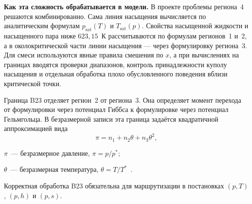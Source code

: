 \textbf{Как эта сложность обрабатывается в модели.}
В проекте проблемы региона~4 решаются комбинированно.
Сама линия насыщения вычисляется по аналитическим формулам
$p_{\mathrm{sat}}(T)$ и $T_{\mathrm{sat}}(p)$.
Свойства насыщенной жидкости и насыщенного пара
ниже $623{,}15$~К рассчитываются по формулам регионов~1 и~2,
а в околокритической части линии насыщения ---
через формулировку региона~3.
Для смеси используются явные правила смешения по $x$,
а при вычислениях на границах вводятся проверки диапазонов,
контроль принадлежности куполу насыщения
и отдельная обработка плохо обусловленного поведения
вблизи критической точки.

Граница B23 отделяет регион~2 от региона~3.
Она определяет момент перехода
от формулировки через потенциал Гиббса
к формулировке через потенциал Гельмгольца.
В безразмерной записи эта граница задаётся
квадратичной аппроксимацией вида
\begin{equation}
\pi = n_{1} + n_{2}\theta + n_{3}\theta^{2},
\end{equation}
\begin{gostwhere}
  \item $\pi$~--- безразмерное давление, $\pi = p/p^{*}$;
  \item $\theta$~--- безразмерная температура, $\theta = T/T^{*}$~\cite{iapws_if97_2012}.
\end{gostwhere}

Корректная обработка B23 обязательна
для маршрутизации в постановках $(p, T)$, $(p, h)$ и $(p, s)$.
